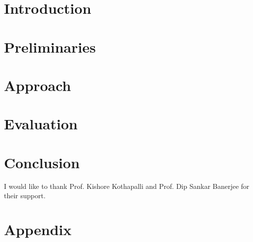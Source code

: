\documentclass[sigconf,nonacm]{acmart}
\newcommand{\ignore}[1]{}
\begin{document}





\maketitle

\section{Introduction}
\label{sec:introduction}


\ignore{\section{Related work}}
\ignore{\label{sec:related}}
\ignore{}

\section{Preliminaries}
\label{sec:preliminaries}


\section{Approach}
\label{sec:approach}


\section{Evaluation}
\label{sec:evaluation}


\section{Conclusion}
\label{sec:conclusion}


\begin{acks}
I would like to thank Prof. Kishore Kothapalli and Prof. Dip Sankar Banerjee for their support.
\end{acks}




\clearpage
\appendix
\section{Appendix}

\end{document}
